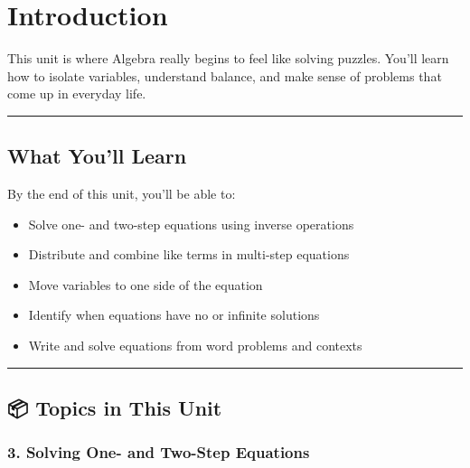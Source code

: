 \documentclass[
  letterpaper,
  DIV=11,
  numbers=noendperiod]{scrreprt}
\providecommand{\tightlist}{%
  \setlength{\itemsep}{0pt}\setlength{\parskip}{0pt}}
\begin{document}
\chapter*{Introduction}\label{introduction-2}


This unit is where Algebra really begins to feel like solving puzzles.
You'll learn how to isolate variables, understand balance, and make
sense of problems that come up in everyday life.

\begin{center}\rule{0.5\linewidth}{0.5pt}\end{center}

\section*{What You'll Learn}\label{what-youll-learn-2}


By the end of this unit, you'll be able to:

\begin{itemize}
\tightlist
\item
  Solve one- and two-step equations using inverse operations
\item
  Distribute and combine like terms in multi-step equations
\item
  Move variables to one side of the equation
\item
  Identify when equations have no or infinite solutions
\item
  Write and solve equations from word problems and contexts
\end{itemize}

\begin{center}\rule{0.5\linewidth}{0.5pt}\end{center}

\section*{📦 Topics in This Unit}\label{topics-in-this-unit-2}


\subsection*{3. Solving One- and Two-Step
Equations}\label{solving-one--and-two-step-equations}
\end{document}
